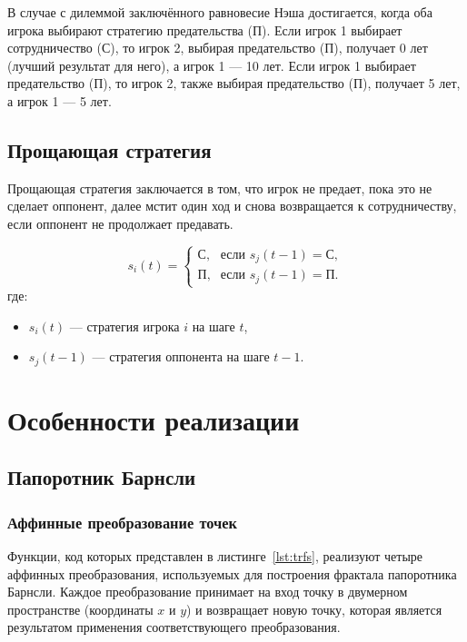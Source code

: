 \documentclass[a4paper, final]{article}
\begin{document}
	В случае с дилеммой заключённого равновесие Нэша достигается, когда оба игрока выбирают стратегию предательства (П). Если игрок 1 выбирает сотрудничество (С), то игрок 2, выбирая предательство (П), получает 0 лет (лучший результат для него), а игрок 1 — 10 лет. Если игрок 1 выбирает предательство (П), то игрок 2, также выбирая предательство (П), получает 5 лет, а игрок 1 — 5 лет.
	
	\subsection{Прощающая стратегия}
	Прощающая стратегия заключается в том, что игрок не предает, пока это не сделает оппонент, далее мстит один ход и снова возвращается к сотрудничеству, если оппонент не продолжает предавать.
	
	\[
	s_i(t) = 
	\begin{cases}
		\text{С}, & \text{если } s_j(t-1) = \text{С}, \\
		\text{П}, & \text{если } s_j(t-1) = \text{П}.
	\end{cases}
	\]
	где:
	\vspace{-10pt}
	\begin{itemize}
		\item \( s_i(t) \) — стратегия игрока \( i \) на шаге \( t \),
		\item \( s_j(t-1) \) — стратегия оппонента на шаге \( t-1 \).
	\end{itemize}
	
	
	\newpage
	\section {Особенности реализации}
	\subsection{Папоротник Барнсли}
	\subsubsection{Аффинные преобразование точек}
	
	Функции, код которых представлен в листинге~\ref{lst:trfs}, реализуют четыре аффинных преобразования, используемых для построения фрактала папоротника Барнсли. Каждое преобразование принимает на вход точку в двумерном пространстве (координаты \( x \) и \( y \)) и возвращает новую точку, которая является результатом применения соответствующего преобразования.
	
\end{document}

